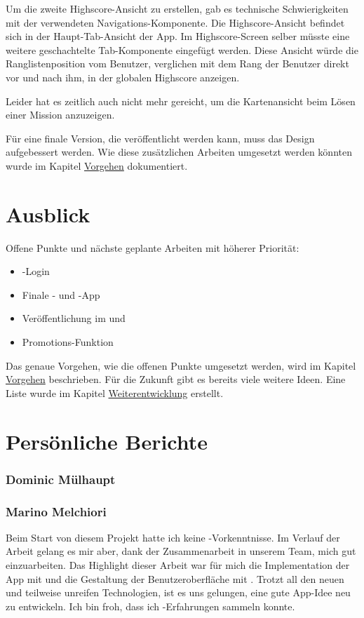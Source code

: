 Um die zweite Highscore-Ansicht zu erstellen, gab es technische Schwierigkeiten mit der verwendeten Navigations-Komponente.
Die Highscore-Ansicht befindet sich in der Haupt-Tab-Ansicht der App. 
Im Highscore-Screen selber müsste eine weitere geschachtelte Tab-Komponente eingefügt werden.
Diese Ansicht würde die Ranglistenposition vom Benutzer, verglichen mit dem Rang der Benutzer direkt vor und nach ihm, in der globalen Highscore anzeigen. 

Leider hat es zeitlich auch nicht mehr gereicht, um die Kartenansicht beim Lösen einer Mission anzuzeigen.

Für eine finale Version, die veröffentlicht werden kann, muss das Design aufgebessert werden. 
Wie diese zusätzlichen Arbeiten umgesetzt werden könnten wurde im Kapitel \hyperref[pd-weiterentwicklung-vorgehen]{Vorgehen} dokumentiert.

\section{Ausblick}
Offene Punkte und nächste geplante Arbeiten mit höherer Priorität:

\begin{itemize}
	\item {}-Login
	\item Finale - und -App
	\item Veröffentlichung im  und  
	\item Promotions-Funktion
\end{itemize}

Das genaue Vorgehen, wie die offenen Punkte umgesetzt werden, wird im Kapitel \hyperref[pd-weiterentwicklung-vorgehen]{Vorgehen} beschrieben.
Für die Zukunft gibt es bereits viele weitere Ideen. 
Eine Liste wurde im Kapitel \hyperref[pd-weiterentwicklung-realistisch]{Weiterentwicklung} erstellt. 

\section{Persönliche Berichte}

\subsubsection{Dominic Mülhaupt}

\subsubsection{Marino Melchiori}
Beim Start von diesem Projekt hatte ich keine -Vorkenntnisse.
Im Verlauf der Arbeit gelang es mir aber, dank der Zusammenarbeit in unserem Team, mich gut  einzuarbeiten.
Das Highlight dieser Arbeit war für mich die Implementation der App mit  und die Gestaltung der Benutzeroberfläche mit .
Trotzt all den neuen und teilweise unreifen Technologien, ist es uns gelungen, eine gute App-Idee neu zu entwickeln.
Ich bin froh, dass ich -Erfahrungen sammeln konnte.